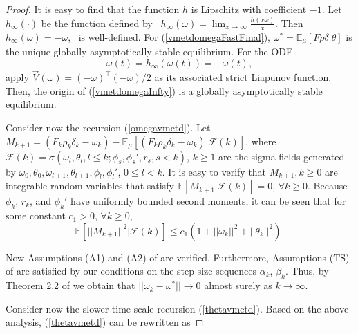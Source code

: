 \begin{proof}
 It is easy to find that the function $h$ is Lipschitz with coefficient
$-1$.
 Let $h_{\infty}(\cdot)$ be the function defined by
 $h_{\infty}(\omega)=\lim_{x\rightarrow \infty}\frac{h(x\omega)}{x}$.
 Then  $h_{\infty}(\omega)= -\omega$,  is well-defined. 
 For (\ref{vmetdomegaFastFinal}), $\omega^*=\mathbb{E}_{\mu}[F\rho\delta|{\theta}]$
 is the unique globally asymptotically stable equilibrium.
 For the ODE
  \begin{equation}
 \dot{\omega}(t) = h_{\infty}(\omega(t))= -\omega(t),
 \label{vmetdomegaInfty}
 \end{equation}
 apply $\vec{V}(\omega)=(-\omega)^{\top}(-\omega)/2$ as its
 associated strict Liapunov function. Then,
 the origin of (\ref{vmetdomegaInfty}) is a globally asymptotically stable
 equilibrium.


 Consider now the recursion (\ref{omegavmetd}).
 Let
$M_{k+1}=(F_k\rho_k\delta_k-\omega_k)
 -\mathbb{E}_{\mu}[(F_k\rho_k\delta_k-\omega_k)|\mathcal{F}(k)]$,
 where $\mathcal{F}(k)=\sigma(\omega_l,{\theta}_l,l\leq k;{\phi}_s,{\phi}_s',r_s,s<k)$, 
$k\geq 1$ are the sigma fields
 generated by $\omega_0,{\theta}_0,\omega_{l+1},{\theta}_{l+1},{\phi}_l,{\phi}_l'$,
$0\leq l<k$.
 It is easy to verify that $M_{k+1},k\geq0$ are integrable random variables that 
 satisfy $\mathbb{E}[M_{k+1}|\mathcal{F}(k)]=0$, $\forall k\geq0$.
 Because ${\phi}_k$, $r_k$, and ${\phi}_k'$ have
 uniformly bounded second moments, it can be seen that for some constant
$c_1>0$, $\forall k\geq0$,
\begin{equation*}
 \mathbb{E}[||M_{k+1}||^2|\mathcal{F}(k)]\leq
 c_1(1+||\omega_k||^2+||{\theta}_k||^2).
\end{equation*}


 Now Assumptions (A1) and (A2) of \cite{borkar2000ode} are verified.
 Furthermore, Assumptions (TS) of \cite{borkar2000ode} are satisfied by our
 conditions on the step-size sequences $\alpha_k$, $\beta_k$. Thus,
 by Theorem 2.2 of \cite{borkar2000ode} we obtain that
$||\omega_k-\omega^*||\rightarrow 0$ almost surely as $k\rightarrow \infty$.

 Consider now the slower time scale recursion (\ref{thetavmetd}).
 Based on the above analysis, (\ref{thetavmetd}) can be rewritten as 


\end{proof}
